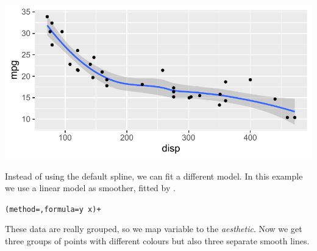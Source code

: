 \documentclass[krantz2]{krantz}\usepackage{knitr}
\begin{document}
\begin{knitrout}\footnotesize
{}\color{fgcolor}\begin{kframe}
\begin{alltt}
\hlstd{(}  \hlstd{(}    \hlopt{+}
  \hlstd{(}  \hlopt{~}  \hlopt{+}
  \hlstd{()}
\end{alltt}


{\ttfamily\noindent\itshape\color{messagecolor}{\#\# `geom\_smooth()` using method = 'loess'}}\end{kframe}

{\centering \includegraphics[width=.7\textwidth]{figure/pos-smooth-plot-02-1} 

}


\end{knitrout}

Instead of using the default spline, we can fit a different model. In this example we use a linear model as smoother, fitted by .

\begin{knitrout}\footnotesize
{}\color{fgcolor}\begin{kframe}
\begin{alltt}
  (method = , formula = y ~ x) +
\end{alltt}
\end{kframe}
\end{knitrout}

These data are really grouped, so we map variable  to the  \emph{aesthetic}. Now we get three groups of points with different colours but also three separate smooth lines.
\end{document}
